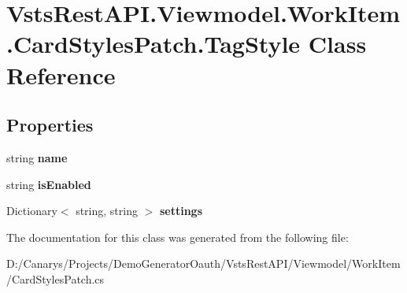 \hypertarget{class_vsts_rest_a_p_i_1_1_viewmodel_1_1_work_item_1_1_card_styles_patch_1_1_tag_style}{}\section{Vsts\+Rest\+A\+P\+I.\+Viewmodel.\+Work\+Item.\+Card\+Styles\+Patch.\+Tag\+Style Class Reference}
\label{class_vsts_rest_a_p_i_1_1_viewmodel_1_1_work_item_1_1_card_styles_patch_1_1_tag_style}
\subsection*{Properties}
\begin{DoxyCompactItemize}
\item 
\mbox{\label{class_vsts_rest_a_p_i_1_1_viewmodel_1_1_work_item_1_1_card_styles_patch_1_1_tag_style_aa22291d9115cbcc380d184a94e7e2674}} 
string {\bfseries name}
\item 
\mbox{\label{class_vsts_rest_a_p_i_1_1_viewmodel_1_1_work_item_1_1_card_styles_patch_1_1_tag_style_a2186abffb373a28f30620c166a76a2af}} 
string {\bfseries is\+Enabled}
\item 
\mbox{\label{class_vsts_rest_a_p_i_1_1_viewmodel_1_1_work_item_1_1_card_styles_patch_1_1_tag_style_a7bb091f585958ad5dd5dc67959543727}} 
Dictionary$<$ string, string $>$ {\bfseries settings}
\end{DoxyCompactItemize}


The documentation for this class was generated from the following file\+:\begin{DoxyCompactItemize}
\item 
D\+:/\+Canarys/\+Projects/\+Demo\+Generator\+Oauth/\+Vsts\+Rest\+A\+P\+I/\+Viewmodel/\+Work\+Item/Card\+Styles\+Patch.\+cs\end{DoxyCompactItemize}

